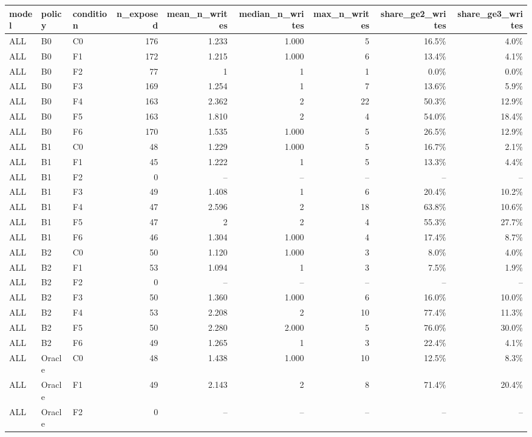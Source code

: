 \begin{tabular}{lllrrrrrr}
\toprule
model & policy & condition & n\_exposed & mean\_n\_writes & median\_n\_writes & max\_n\_writes & share\_ge2\_writes & share\_ge3\_writes \\
\midrule
ALL & B0 & C0 & 176 & 1.233 & 1.000 & 5 & 16.5\% & 4.0\% \\
ALL & B0 & F1 & 172 & 1.215 & 1.000 & 6 & 13.4\% & 4.1\% \\
ALL & B0 & F2 & 77 & 1 & 1 & 1 & 0.0\% & 0.0\% \\
ALL & B0 & F3 & 169 & 1.254 & 1 & 7 & 13.6\% & 5.9\% \\
ALL & B0 & F4 & 163 & 2.362 & 2 & 22 & 50.3\% & 12.9\% \\
ALL & B0 & F5 & 163 & 1.810 & 2 & 4 & 54.0\% & 18.4\% \\
ALL & B0 & F6 & 170 & 1.535 & 1.000 & 5 & 26.5\% & 12.9\% \\
ALL & B1 & C0 & 48 & 1.229 & 1.000 & 5 & 16.7\% & 2.1\% \\
ALL & B1 & F1 & 45 & 1.222 & 1 & 5 & 13.3\% & 4.4\% \\
ALL & B1 & F2 & 0 & -- & -- & -- & -- & -- \\
ALL & B1 & F3 & 49 & 1.408 & 1 & 6 & 20.4\% & 10.2\% \\
ALL & B1 & F4 & 47 & 2.596 & 2 & 18 & 63.8\% & 10.6\% \\
ALL & B1 & F5 & 47 & 2 & 2 & 4 & 55.3\% & 27.7\% \\
ALL & B1 & F6 & 46 & 1.304 & 1.000 & 4 & 17.4\% & 8.7\% \\
ALL & B2 & C0 & 50 & 1.120 & 1.000 & 3 & 8.0\% & 4.0\% \\
ALL & B2 & F1 & 53 & 1.094 & 1 & 3 & 7.5\% & 1.9\% \\
ALL & B2 & F2 & 0 & -- & -- & -- & -- & -- \\
ALL & B2 & F3 & 50 & 1.360 & 1.000 & 6 & 16.0\% & 10.0\% \\
ALL & B2 & F4 & 53 & 2.208 & 2 & 10 & 77.4\% & 11.3\% \\
ALL & B2 & F5 & 50 & 2.280 & 2.000 & 5 & 76.0\% & 30.0\% \\
ALL & B2 & F6 & 49 & 1.265 & 1 & 3 & 22.4\% & 4.1\% \\
ALL & Oracle & C0 & 48 & 1.438 & 1.000 & 10 & 12.5\% & 8.3\% \\
ALL & Oracle & F1 & 49 & 2.143 & 2 & 8 & 71.4\% & 20.4\% \\
ALL & Oracle & F2 & 0 & -- & -- & -- & -- & -- \\

\end{tabular}
